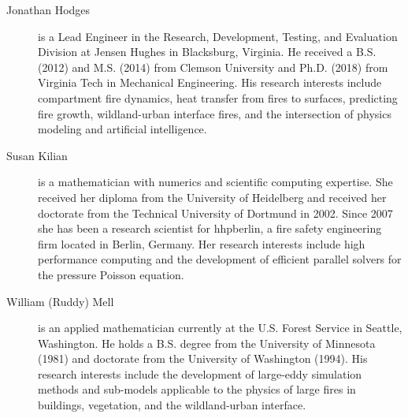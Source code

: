 \begin{description}
\item[Jonathan Hodges] is a Lead Engineer in the Research, Development, Testing, and Evaluation Division at Jensen Hughes in Blacksburg, Virginia. He received a B.S. (2012) and M.S. (2014) from Clemson University and Ph.D. (2018) from Virginia Tech in Mechanical Engineering. His research interests include compartment fire dynamics, heat transfer from fires to surfaces, predicting fire growth, wildland-urban interface fires, and the intersection of physics modeling and artificial intelligence.

\item[Susan Kilian] is a mathematician with numerics and scientific computing expertise. She received her diploma from the University of Heidelberg and received her doctorate from the Technical University of Dortmund in 2002. Since 2007 she has been a research scientist for hhpberlin, a fire safety engineering firm located in Berlin, Germany. Her research interests include high performance computing and the development of efficient parallel solvers for the pressure Poisson equation.



\item[William (Ruddy) Mell] is an applied mathematician currently at the U.S. Forest Service in Seattle, Washington. He holds a B.S. degree from the University of Minnesota (1981) and doctorate from the University of Washington (1994). His research interests include the development of large-eddy simulation methods and sub-models applicable to the physics of large fires in buildings, vegetation, and the wildland-urban interface.


\end{description}
